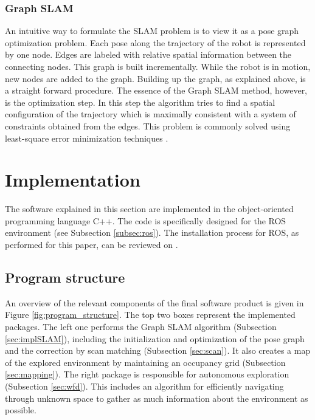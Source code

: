 \documentclass{ba-kecs}
\begin{document}
\subsubsection{Graph SLAM}
An intuitive way to formulate the SLAM problem is to view it as a pose graph optimization problem. Each pose along the trajectory of the robot is represented by one node. Edges are labeled with relative spatial information between the connecting nodes. This graph is built incrementally. While the robot is in motion, new nodes are added to the graph. Building up the graph, as explained above, is a straight forward procedure. The essence of the Graph SLAM method, however, is the optimization step. In this step the algorithm tries to find a spatial configuration of the trajectory which is maximally consistent with a system of constraints obtained from the edges. This problem is commonly solved using least-square error minimization techniques \citep{Grisetti}.

\section{Implementation}
\label{sec:impl}

The software explained in this section are implemented in the object-oriented programming language C++. The code is specifically designed for the ROS environment (see Subsection \ref{subsec:ros}). The installation process for ROS, as performed for this paper, can be reviewed on \cite{swarmlab}.

\subsection{Program structure}
An overview of the relevant components of the final software product is given in Figure \ref{fig:program_structure}. The top two boxes represent the implemented packages. The left one performs the Graph SLAM algorithm (Subsection \ref{sec:implSLAM}), including the initialization and optimization of the pose graph and the correction by scan matching (Subsection \ref{sec:scan}). It also creates a map of the explored environment by maintaining an occupancy grid (Subsection \ref{sec:mapping}). The right package is responsible for autonomous exploration (Subsection \ref{sec:wfd}). This includes an algorithm for efficiently navigating through unknown space to gather as much information about the environment as possible.
\end{document}
